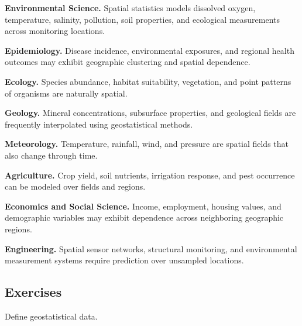 \begin{applicationbox}

\textbf{Environmental Science.}
Spatial statistics models dissolved oxygen, temperature, salinity,
pollution, soil properties, and ecological measurements across
monitoring locations.

\medskip

\textbf{Epidemiology.}
Disease incidence, environmental exposures, and regional health outcomes
may exhibit geographic clustering and spatial dependence.

\medskip

\textbf{Ecology.}
Species abundance, habitat suitability, vegetation, and point patterns of
organisms are naturally spatial.

\medskip

\textbf{Geology.}
Mineral concentrations, subsurface properties, and geological fields are
frequently interpolated using geostatistical methods.

\medskip

\textbf{Meteorology.}
Temperature, rainfall, wind, and pressure are spatial fields that also
change through time.

\medskip

\textbf{Agriculture.}
Crop yield, soil nutrients, irrigation response, and pest occurrence can
be modeled over fields and regions.

\medskip

\textbf{Economics and Social Science.}
Income, employment, housing values, and demographic variables may exhibit
dependence across neighboring geographic regions.

\medskip

\textbf{Engineering.}
Spatial sensor networks, structural monitoring, and environmental
measurement systems require prediction over unsampled locations.

\end{applicationbox}

\subsection{Exercises}
\label{subsec:spatial-exercises}

\begin{exercise}[1]
Define geostatistical data.
\end{exercise}

